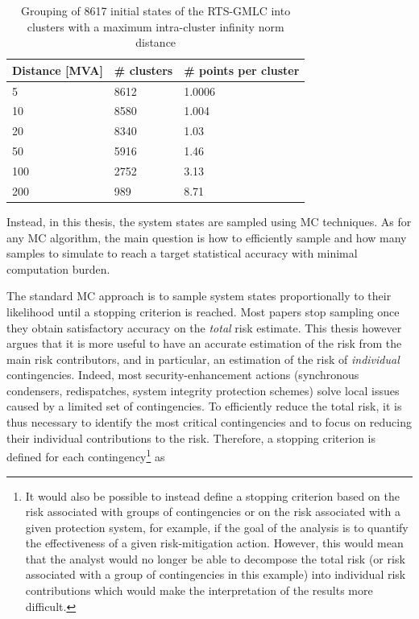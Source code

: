 \begin{table}
\centering
\caption{Grouping of 8617 initial states of the RTS-GMLC into clusters with a maximum intra-cluster infinity norm distance}
\label{tab:clustering}
\begin{tabular}{@{}lll@{}}
\toprule
Distance [MVA] & \# clusters & \# points per cluster \\ \midrule
5             & 8612        & 1.0006    \\
10            & 8580        & 1.004     \\
20            & 8340        & 1.03      \\
50            & 5916        & 1.46      \\
100           & 2752        & 3.13      \\
200           & 989         & 8.71      \\ \bottomrule
\end{tabular}
\end{table}

Instead, in this thesis, the system states are sampled using MC techniques. As for any MC algorithm, the main question is how to efficiently sample and how many samples to simulate to reach a target statistical accuracy with minimal computation burden.


The standard MC approach is to sample system states proportionally to their likelihood until a stopping criterion is reached. Most papers stop sampling once they obtain satisfactory accuracy on the \emph{total} risk estimate. This thesis however argues that it is more useful to have an accurate estimation of the risk from the main risk contributors, and in particular, an estimation of the risk of \emph{individual} contingencies. Indeed, most security-enhancement actions (synchronous condensers, redispatches, system integrity protection schemes) solve local issues caused by a limited set of contingencies. To efficiently reduce the total risk, it is thus necessary to identify the most critical contingencies and to focus on reducing their individual contributions to the risk. Therefore, a stopping criterion is defined for each contingency\footnote{It would also be possible to instead define a stopping criterion based on the risk associated with groups of contingencies or on the risk associated with a given protection system, for example, if the goal of the analysis is to quantify the effectiveness of a given risk-mitigation action. However, this would mean that the analyst would no longer be able to decompose the total risk (or risk associated with a group of contingencies in this example) into individual risk contributions which would make the interpretation of the results more difficult.} as

